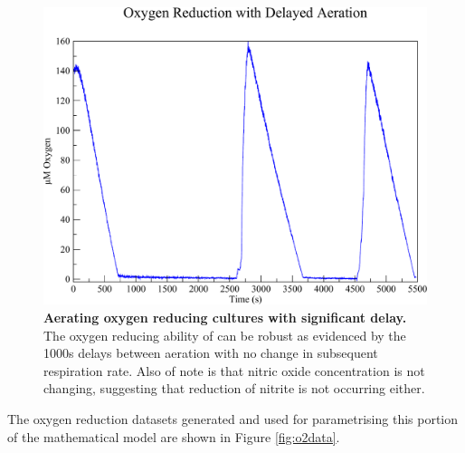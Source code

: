 \begin{figure}[t]
 \centering
 \includegraphics[width=13cm]{./05-oxygenreduction/data/o2_delay.pdf}
 \caption[Aerating oxygen reducing cultures with significant delay]{{\bf Aerating oxygen reducing cultures with significant delay.} The oxygen reducing ability of \Nm{} can be robust as evidenced by the 1000s delays between aeration with no change in subsequent respiration rate. Also of note is that nitric oxide concentration is not changing, suggesting that reduction of nitrite is not occurring either.
 \label{fig:repeat_oxy_with_delay}}
\end{figure}

The oxygen reduction datasets generated and used for parametrising this portion of the mathematical model are shown in Figure \ref{fig:o2data}.

